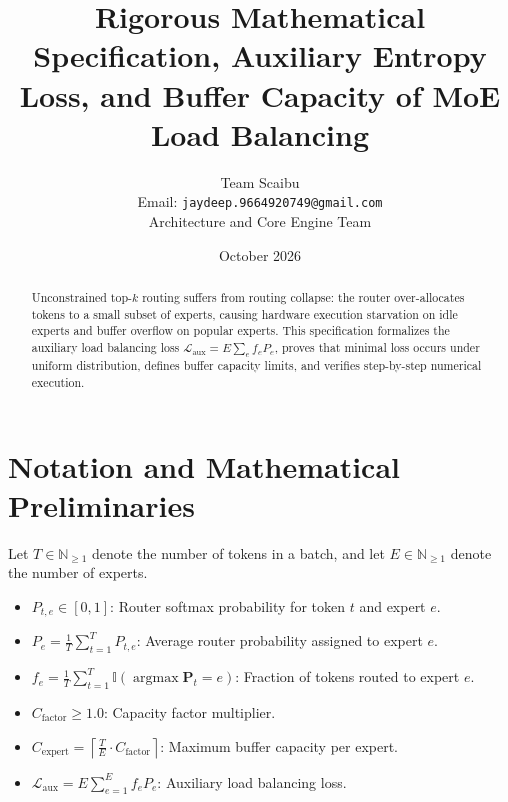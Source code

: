 \documentclass[11pt,a4paper]{article}
\title{\textbf{Rigorous Mathematical Specification, Auxiliary Entropy Loss, and Buffer Capacity of MoE Load Balancing}}
\author{Team Scaibu \\ \small Email: \texttt{jaydeep.9664920749@gmail.com} \\ \small Architecture and Core Engine Team}
\date{October 2026}
\theoremstyle{definition}
\begin{document}
\maketitle

\begin{abstract}
Unconstrained top-$k$ routing suffers from routing collapse: the router over-allocates tokens to a small subset of experts, causing hardware execution starvation on idle experts and buffer overflow on popular experts. This specification formalizes the auxiliary load balancing loss $\mathcal{L}_{\text{aux}} = E \sum_{e} f_e P_e$, proves that minimal loss occurs under uniform distribution, defines buffer capacity limits, and verifies step-by-step numerical execution.
\end{abstract}

\section{Notation and Mathematical Preliminaries}

Let $T \in \mathbb{N}_{\ge 1}$ denote the number of tokens in a batch, and let $E \in \mathbb{N}_{\ge 1}$ denote the number of experts.

\begin{itemize}
    \item $P_{t, e} \in [0, 1]$: Router softmax probability for token $t$ and expert $e$.
    \item $P_e = \frac{1}{T} \sum_{t=1}^T P_{t, e}$: Average router probability assigned to expert $e$.
    \item $f_e = \frac{1}{T} \sum_{t=1}^T \mathbb{I}(\operatorname{argmax} \mathbf{P}_t = e)$: Fraction of tokens routed to expert $e$.
    \item $C_{\text{factor}} \ge 1.0$: Capacity factor multiplier.
    \item $C_{\text{expert}} = \left\lceil \frac{T}{E} \cdot C_{\text{factor}} \right\rceil$: Maximum buffer capacity per expert.
    \item $\mathcal{L}_{\text{aux}} = E \sum_{e=1}^E f_e P_e$: Auxiliary load balancing loss.
\end{itemize}
\end{document}

